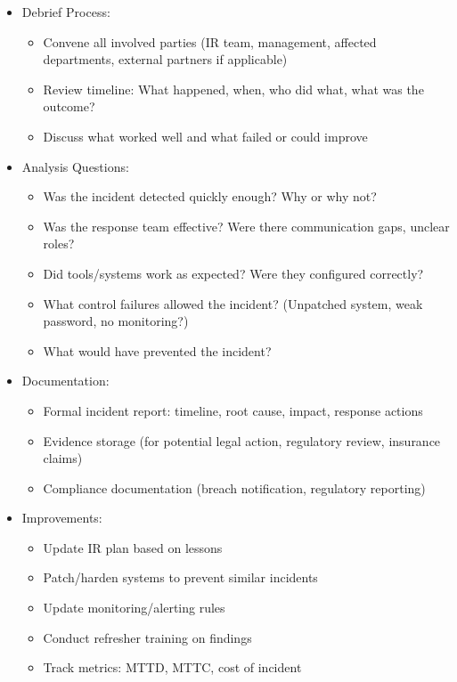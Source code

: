 \documentclass[10pt]{article}
\begin{document}
\begin{itemize}
  \item Debrief Process:
  \begin{itemize}
  	\item Convene all involved parties (IR team, management, affected departments, external partners if applicable)
  	\item Review timeline: What happened, when, who did what, what was the outcome?
  	\item Discuss what worked well and what failed or could improve
  \end{itemize}
  \item Analysis Questions:
  \begin{itemize}
  	\item Was the incident detected quickly enough? Why or why not?
  	\item Was the response team effective? Were there communication gaps, unclear roles?
  	\item Did tools/systems work as expected? Were they configured correctly?
  	\item What control failures allowed the incident? (Unpatched system, weak password, no monitoring?)
  	\item What would have prevented the incident?
  \end{itemize}
  \item Documentation:
  \begin{itemize}
  	\item Formal incident report: timeline, root cause, impact, response actions
  	\item Evidence storage (for potential legal action, regulatory review, insurance claims)
  	\item Compliance documentation (breach notification, regulatory reporting)
  \end{itemize}
  \item Improvements:
  \begin{itemize}
  	\item Update IR plan based on lessons
  	\item Patch/harden systems to prevent similar incidents
  	\item Update monitoring/alerting rules
  	\item Conduct refresher training on findings
  	\item Track metrics: MTTD, MTTC, cost of incident
  \end{itemize}
\end{itemize}
\end{document}
